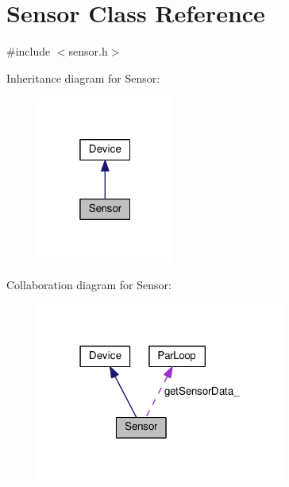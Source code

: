 \hypertarget{class_sensor}{}\section{Sensor Class Reference}
\label{class_sensor}


{\ttfamily \#include $<$sensor.\+h$>$}



Inheritance diagram for Sensor\+:\nopagebreak
\begin{figure}[H]
\begin{center}
\leavevmode
\includegraphics[width=127pt]{class_sensor__inherit__graph}
\end{center}
\end{figure}


Collaboration diagram for Sensor\+:\nopagebreak
\begin{figure}[H]
\begin{center}
\leavevmode
\includegraphics[width=231pt]{class_sensor__coll__graph}
\end{center}
\end{figure}
